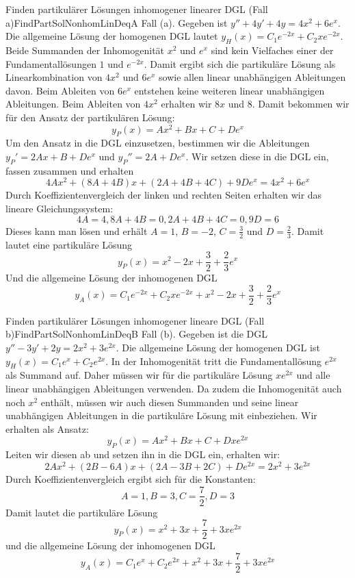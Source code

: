 \begin{example}{Finden partikulärer Lösungen inhomogener linearer DGL (Fall a)}{FindPartSolNonhomLinDeqA}
    Fall (a). Gegeben ist $y''+4y'+4y = 4x^2+6e^x$. Die allgemeine Lösung der homogenen DGL lautet $y_H(x) = C_1 e^{-2x}+ C_2 x e^{-2x}$. Beide Summanden der Inhomogenität $x^2$ und $e^x$ sind kein Vielfaches einer der Fundamentallösungen $1$ und $e^{-2x}$. Damit ergibt sich die partikuläre Lösung als Linearkombination von $4x^2$ und $6e^x$ sowie allen linear unabhängigen Ableitungen davon. Beim Ableiten von $6e^x$ entstehen keine weiteren linear unabhängigen Ableitungen. Beim Ableiten von $4x^2$ erhalten wir $8x$ und $8$. Damit bekommen wir für den Ansatz der partikulären Lösung:
    $$
        y_P(x) = Ax^2+Bx+C+De^x
    $$
    Um den Ansatz in die DGL einzusetzen, bestimmen wir die Ableitungen $y_P'=2Ax+B+De^x$ und $y_P''=2A+De^x$. Wir setzen diese in die DGL ein, fassen zusammen und erhalten
    $$
        4Ax^2+(8A+4B)x+(2A+4B+4C)+9De^x = 4x^2 + 6e^x
    $$
    Durch Koeffizientenvergleich der linken und rechten Seiten erhalten wir das lineare Gleichungssystem:
    $$
        4A = 4, 8A+4B=0, 2A+4B+4C=0, 9D=6
    $$
    Dieses kann man lösen und erhält $A=1$, $B=-2$, $C=\frac{3}{2}$ und $D=\frac{2}{3}$. Damit lautet eine partikuläre Lösung
    $$
        y_P(x) = x^2 - 2x +\frac{3}{2} + \frac{2}{3}e^x
    $$
    Und die allgemeine Lösung der inhomogenen DGL
    $$
        y_A(x) = C_1  e^{-2x} + C_2 x e^{-2x} + x^2 - 2x +\frac{3}{2} + \frac{2}{3}e^x
    $$
\end{example}

\begin{example}{Finden partikulärer Lösungen inhomogener lineare DGL (Fall b)}{FindPartSolNonhomLinDeqB}
    Fall (b). Gegeben ist die DGL $y''-3y'+2y=2x^2+3e^{2x}$. Die allgemeine Lösung der homogenen DGL ist $y_H(x) = C_1 e^x + C_2 e^{2x}$. In der Inhomogenität tritt die Fundamentallösung $e^{2x}$ als Summand auf. Daher müssen wir für die partikuläre Lösung $x e^{2x}$ und alle linear unabhängigen Ableitungen verwenden. Da zudem die Inhomogenität auch noch $x^2$ enthält, müssen wir auch diesen Summanden und seine linear unabhängigen Ableitungen in die partikuläre Lösung mit einbeziehen. Wir erhalten als Ansatz:
    $$
        y_P(x) = A x^2+Bx+C+Dxe^{2x}
    $$
    Leiten wir diesen ab und setzen ihn in die DGL ein, erhalten wir:
    $$
        2Ax^2 + (2B-6A)x + (2A-3B+2C) + De^{2x} = 2x^2 + 3e^{2x}
    $$
    Durch Koeffizientenvergleich ergibt sich für die Konstanten:
    $$
        A = 1, B=3, C=\frac{7}{2}, D=3
    $$
    Damit lautet die partikuläre Lösung
    $$
        y_P(x) = x^2+3x+\frac{7}{2}+3xe^{2x}
    $$
    und die allgemeine Lösung der inhomogenen DGL
    $$
        y_A(x) = C_1 e^x + C_2 e^{2x} + x^2+3x+\frac{7}{2}+3xe^{2x}
    $$
\end{example}

